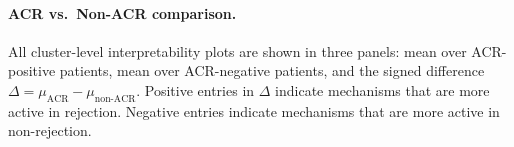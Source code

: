 \documentclass[11pt,a4paper]{article}
\begin{document}
\paragraph{ACR vs.\ Non-ACR comparison.}
All cluster-level interpretability plots are shown in three panels: mean over
ACR-positive patients, mean over ACR-negative patients, and the signed
difference $\Delta = \mu_\text{ACR} - \mu_\text{non-ACR}$.
Positive entries in $\Delta$ indicate mechanisms that are more active in
rejection.
Negative entries indicate mechanisms that are more active in non-rejection.



\end{document}
